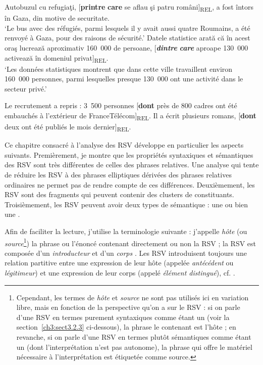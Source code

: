 \ea \label{ch3:ex5}
\ea
Autobuzul cu refugiaţi, [\textbf{printre} \textbf{care} se aflau şi patru români]\textsubscript{REL}, a fost întors în Gaza, din motive de securitate. \\
\glt ‘Le bus avec des réfugiés, parmi lesquels il y avait aussi quatre Roumains, a été renvoyé à Gaza, pour des raisons de sécurité.’
\ex
Datele statistice arată că în acest oraş lucrează aproximativ 160~000 de persoane, [\emph{\textbf{\textup{dintre}}}\emph{\textbf{} }\emph{\textbf{\textup{care}}} aproape 130~000 activează în domeniul privat]\textsubscript{REL}.\\
\glt ‘Les données statistiques montrent que dans cette ville travaillent environ 160~000 personnes, parmi lesquelles presque 130~000 ont une activité dans le secteur privé.’
\z
\z

\ea \label{ch3:ex6} 
\ea
Le recrutement a repris : 3~500 personnes [\textbf{dont} près de 800 cadres ont été embauchés  à l’extérieur de FranceTélécom]\textsubscript{REL}.
\ex 
Il a écrit plusieurs romans, [\textbf{dont} deux ont été publiés le mois dernier]\textsubscript{REL}.
\z
\z

Ce chapitre consacré à l’analyse des RSV développe en particulier les aspects suivants. Premièrement, je montre que les propriétés syntaxiques et sémantiques des RSV sont très différentes de celles des phrases relatives. Une analyse qui tente de réduire les RSV à des phrases elliptiques dérivées des phrases relatives ordinaires ne permet pas de rendre compte de ces différences. Deuxièmement, les RSV sont des fragments qui peuvent contenir des clusters de constituants. Troisièmement, les RSV peuvent avoir deux types de sémantique : une  ou bien une .

Afin de faciliter la lecture, j’utilise la terminologie suivante : j’appelle \textit{hôte} (ou \textit{source}\footnote{Cependant, les termes de \textit{hôte} et \textit{source} ne sont pas utilisés ici en variation libre, mais en fonction de la perspective qu’on a sur le RSV : si on parle d’une RSV en termes purement syntaxiques comme étant un  (voir la section~\ref{ch3:sect3.2.3} ci-dessous), la phrase le contenant est l’hôte ; en revanche, si on parle d’une RSV en termes plutôt sémantiques comme étant un  (dont l’interprétation n’est pas autonome), la phrase qui offre le matériel nécessaire à l’interprétation est étiquetée comme source.}) la phrase ou l’énoncé contenant directement ou non la RSV  ; la RSV est composée d’un \textit{introducteur} et d’un \textit{corps} . Les RSV introduisent toujours une relation partitive entre une expression de leur hôte (appelée \textit{antécédent} ou \textit{légitimeur}) et une expression de leur corps (appelé \textit{élément distingué}), cf. .

